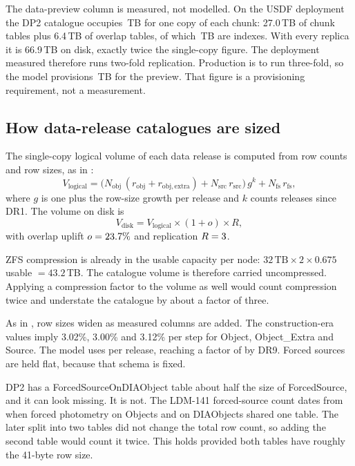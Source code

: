 The data-preview column is measured, not modelled. On the USDF deployment the
DP2 catalogue occupies \smQsDPtwoLogicalTB{}\,TB for one copy of each chunk:
27.0\,TB of chunk tables plus 6.4\,TB of overlap tables, of which
\smQsDPtwoIndexTB{}\,TB are indexes. With every replica it is 66.9\,TB on disk,
exactly twice the single-copy figure. The deployment measured therefore runs
two-fold replication. Production is to run three-fold, so the model
provisions \smQsDPtwoDiskTB{}\,TB for the preview. That figure is a
provisioning requirement, not a measurement.

\subsection{How data-release catalogues are sized}

The single-copy logical volume of each data release is computed from
 row counts and row sizes, as in :
\[
  V_{\mathrm{logical}} =
  \bigl(N_{\mathrm{obj}}\,(r_{\mathrm{obj}} + r_{\mathrm{obj,extra}})
        + N_{\mathrm{src}}\,r_{\mathrm{src}}\bigr)\,g^{k}
  + N_{\mathrm{fs}}\,r_{\mathrm{fs}} ,
\]
where $g$ is one plus the row-size growth per release and $k$ counts releases
since DR1. The volume on disk is
\[
  V_{\mathrm{disk}} = V_{\mathrm{logical}} \times (1 + o) \times R ,
\]
with overlap uplift $o = 23.7\%$ and replication $R = 3$.

ZFS compression is already in the usable capacity per node:
$32\,\mathrm{TB} \times 2 \times 0.675$ usable $= 43.2$\,TB. The catalogue
volume is therefore carried uncompressed. Applying a compression factor to the
volume as well would count compression twice and understate the catalogue by
about a factor of three.

As in , row sizes widen as measured columns are
added. The construction-era values imply 3.02\%, 3.00\% and 3.12\% per step for
Object, Object\_Extra and Source. The model uses \smRowGrowth{} per release,
reaching a factor of \smQsDRnineInfl{} by DR9. Forced sources are held flat,
because that schema is fixed.

DP2 has a ForcedSourceOnDIAObject table about half the size of ForcedSource,
and it can look missing. It is not. The LDM-141 forced-source count dates from
when forced photometry on Objects and on DIAObjects shared one table. The later
split into two tables did not change the total row count, so adding the
second table would count it twice. This holds provided both tables have
roughly the 41-byte row size.

